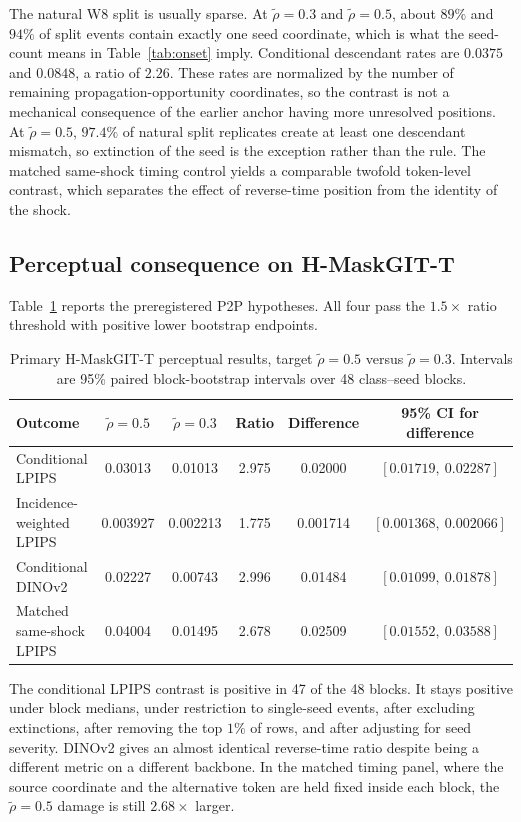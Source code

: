 \documentclass[11pt,a4paper]{article}
\theoremstyle{plain}
\theoremstyle{definition}
\theoremstyle{remark}
\newcommand{\rholabel}{\widetilde{\rho}}
\begin{document}
The natural W8 split is usually sparse. At $\rholabel=0.3$ and $\rholabel=0.5$, about
$89\%$ and $94\%$ of split events contain exactly one seed coordinate, which is
what the seed-count means in Table~\ref{tab:onset} imply. Conditional descendant
rates are $0.0375$ and $0.0848$, a ratio of $2.26$. These rates are normalized
by the number of remaining propagation-opportunity coordinates, so the contrast
is not a mechanical consequence of the earlier anchor having more unresolved
positions. At $\rholabel=0.5$, $97.4\%$ of
natural split replicates create at least one descendant mismatch, so extinction
of the seed is the exception rather than the rule. The matched same-shock timing
control yields a comparable twofold token-level contrast, which separates the
effect of reverse-time position from the identity of the shock.

\subsection{Perceptual consequence on H-MaskGIT-T}
\label{sec:perceptual}

Table~\ref{tab:primary} reports the preregistered P2P hypotheses. All four pass
the $1.5\times$ ratio threshold with positive lower bootstrap endpoints.

\begin{table}[t]
\centering
\caption{Primary H-MaskGIT-T perceptual results, target $\rholabel=0.5$ versus $\rholabel=0.3$.
Intervals are 95\% paired block-bootstrap intervals over 48 class--seed blocks.}
\label{tab:primary}
\small
\begin{tabular}{@{}lccccc@{}}
\toprule
Outcome & $\rholabel=0.5$ & $\rholabel=0.3$ & Ratio & Difference & 95\% CI for difference \\
\midrule
Conditional LPIPS        & 0.03013  & 0.01013  & 2.975 & 0.02000  & $[0.01719,\ 0.02287]$ \\
Incidence-weighted LPIPS & 0.003927 & 0.002213 & 1.775 & 0.001714 & $[0.001368,\ 0.002066]$ \\
Conditional DINOv2       & 0.02227  & 0.00743  & 2.996 & 0.01484  & $[0.01099,\ 0.01878]$ \\
Matched same-shock LPIPS & 0.04004  & 0.01495  & 2.678 & 0.02509  & $[0.01552,\ 0.03588]$ \\
\bottomrule
\end{tabular}
\end{table}

The conditional LPIPS contrast is positive in 47 of the 48 blocks. It stays
positive under block medians, under restriction to single-seed events, after
excluding extinctions, after removing the top $1\%$ of rows, and after adjusting
for seed severity. DINOv2 gives an almost identical reverse-time ratio despite
being a different metric on a different backbone. In the matched timing panel,
where the source coordinate and the alternative token are held fixed inside each
block, the $\rholabel=0.5$ damage is still $2.68\times$ larger.
\end{document}
